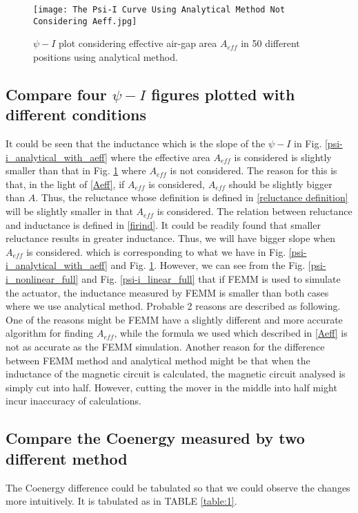 \documentclass[a4paper]{IEEEtran}
\begin{document}
{\begin{figure}[!ht]
\begin{centering}
\texttt{[image: The Psi-I Curve Using Analytical Method Not Considering Aeff.jpg]}
\par\end{centering}   
\caption{$\psi-I$ plot considering effective air-gap area $A_{eff}$ in 50 different positions using analytical method.\label{psi-i_analytical_without_aeff}}
\end{figure} 

\subsection{Compare four $\psi-I$ figures plotted with different conditions}
It could be seen that the inductance which is the slope of the $\psi-I$ in Fig. \ref{psi-i_analytical_with_aeff} where the 
effective area $A_{eff}$ is considered
is slightly smaller than that in Fig. \ref{psi-i_analytical_without_aeff} where $A_{eff}$ is not considered. 
The reason for this is that, in the light of \eqref{Aeff},
if $A_{eff}$ is considered, $A_{eff}$ should be slightly bigger than $A$. 
Thus, the reluctance whose definition is defined in \eqref{reluctance definition}
will be slightly smaller in that $A_{eff}$ is considered. The relation between reluctance and inductance is defined in \eqref{firind}.
It could be readily found that smaller reluctance results in greater inductance. Thus, we will have bigger slope when $A_{eff}$ is considered.
which is corresponding to what we have in Fig. \ref{psi-i_analytical_with_aeff} and Fig. \ref{psi-i_analytical_without_aeff}.
However, we can see from the Fig. \ref{psi-i_nonlinear_full} and Fig. \ref{psi-i_linear_full} that if FEMM is used to simulate the actuator,
the inductance measured by FEMM is smaller than both cases where we use analytical method. Probable 2 reasons are described as following. 
One of the reasons might be FEMM have a slightly different
and more accurate algorithm for finding $A_{eff}$, while the formula we used which described in \eqref{Aeff} is not as accurate as the FEMM simulation.
Another reason for the difference between FEMM method and analytical method might be that when the inductance of the magnetic circuit is calculated, 
the magnetic circuit analysed is simply cut into half. However, cutting the mover in the middle into half might incur inaccuracy of calculations.\par
\subsection{Compare the Coenergy measured by two different method}
The Coenergy difference could be tabulated so that we could observe the changes more intuitively.
It is tabulated as in TABLE \ref{table:1}.

}
\end{document}
